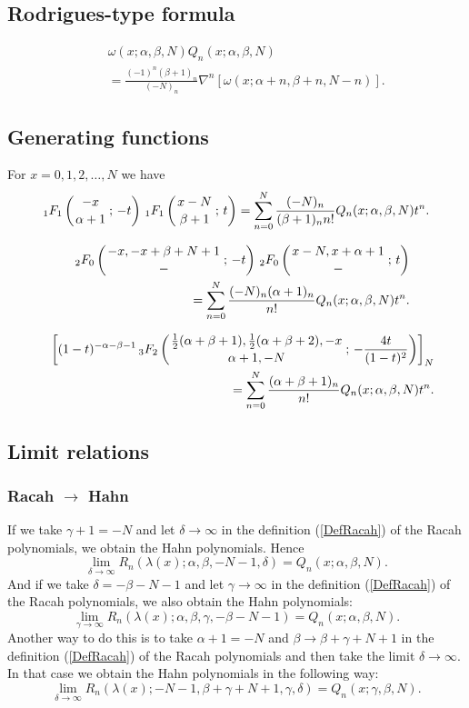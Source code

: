 \documentclass[envcountchap,graybox]{svmono}
\newcommand{\hyp}[5]{\mbox{}_{#1}{F}_{#2}
\left(\genfrac{}{}{0pt}{}{#3}{#4}\,;\,#5\right)}
\begin{document}
\subsection*{Rodrigues-type formula}
\begin{eqnarray}
\label{RodHahn}
& &\omega(x;\alpha,\beta,N)Q_n(x;\alpha,\beta,N)\nonumber\\
& &{}=\frac{(-1)^n(\beta+1)_n}{(-N)_n}\nabla^n\left[\omega(x;\alpha+n,\beta+n,N-n)\right].
\end{eqnarray}

\subsection*{Generating functions}
For $x=0,1,2,\ldots,N$ we have
\begin{equation}
\label{GenHahn1}
\hyp{1}{1}{-x}{\alpha+1}{-t}\,\hyp{1}{1}{x-N}{\beta+1}{t}
=\sum_{n=0}^N\frac{(-N)_n}{(\beta+1)_nn!}Q_n(x;\alpha,\beta,N)t^n.
\end{equation}

\begin{eqnarray}
\label{GenHahn2}
& &\hyp{2}{0}{-x,-x+\beta+N+1}{-}{-t}\,\hyp{2}{0}{x-N,x+\alpha+1}{-}{t}\nonumber\\
& &{}=\sum_{n=0}^N\frac{(-N)_n(\alpha+1)_n}{n!}Q_n(x;\alpha,\beta,N)t^n.
\end{eqnarray}

\begin{eqnarray}
\label{GenHahn3}
& &\left[(1-t)^{-\alpha-\beta-1}\,\hyp{3}{2}{\frac{1}{2}(\alpha+\beta+1),\frac{1}{2}(\alpha+\beta+2),-x}
{\alpha+1,-N}{-\frac{4t}{(1-t)^2}}\right]_N\nonumber\\
& &{}=\sum_{n=0}^N\frac{(\alpha+\beta+1)_n}{n!}Q_n(x;\alpha,\beta,N)t^n.
\end{eqnarray}

\subsection*{Limit relations}

\subsubsection*{Racah $\rightarrow$ Hahn}
If we take $\gamma+1=-N$ and let $\delta\rightarrow\infty$ in the definition (\ref{DefRacah})
of the Racah polynomials, we obtain the Hahn polynomials. Hence
$$\lim_{\delta\rightarrow\infty}
R_n(\lambda(x);\alpha,\beta,-N-1,\delta)=Q_n(x;\alpha,\beta,N).$$
And if we take $\delta=-\beta-N-1$ and let $\gamma\rightarrow\infty$ in the definition (\ref{DefRacah})
of the Racah polynomials, we also obtain the Hahn polynomials:
$$\lim_{\gamma\rightarrow\infty}
R_n(\lambda(x);\alpha,\beta,\gamma,-\beta-N-1)=Q_n(x;\alpha,\beta,N).$$
Another way to do this is to take $\alpha+1=-N$ and $\beta\rightarrow\beta+\gamma+N+1$ in
the definition (\ref{DefRacah}) of the Racah polynomials and then take the limit
$\delta\rightarrow\infty$. In that case we obtain the Hahn polynomials in the following way:
$$\lim_{\delta\rightarrow\infty}
R_n(\lambda(x);-N-1,\beta+\gamma+N+1,\gamma,\delta)=Q_n(x;\gamma,\beta,N).$$
\end{document}
